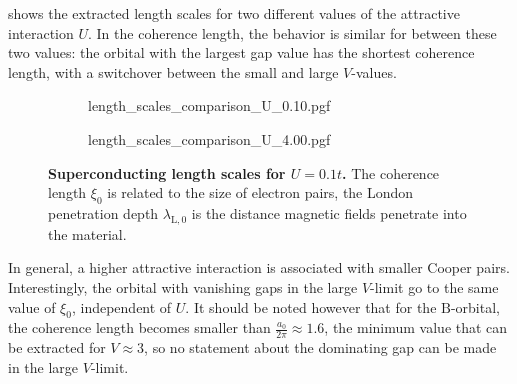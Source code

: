 \documentclass[../notes.tex]{subfiles}
\begin{document}
 shows the extracted length scales for two different values of the attractive interaction \(U\).
In the coherence length, the behavior is similar for between these two values: the orbital with the largest gap value has the shortest coherence length, with a switchover between the small and large \(V\)-values.
\begin{figure}[!tb]
	\centering
	\begin{subfigure}[b]{0.5\textwidth}
		\centering
		\caption{\hfill\null}\label{sfig:decorated graphene length scales U 0.10}
		{length_scales_comparison_U_0.10.pgf}
	\end{subfigure}%
	\begin{subfigure}[b]{0.5\textwidth}
		\centering
		\caption{\hfill\null}\label{sfig:decorated graphene length scales U 4.00}
		{length_scales_comparison_U_4.00.pgf}
	\end{subfigure}
	\caption[Superconducting length scales for \(U = 0.1t\).]{
		\textbf{Superconducting length scales for \(U = 0.1t\).} The coherence length \(\xi_0\) is related to the size of electron pairs, the London penetration depth \(\lambda_{\mathrm{L}, 0}\) is the distance magnetic fields penetrate into the material.
	}
	\label{fig:decorated graphene length scales}
\end{figure}
In general, a higher attractive interaction is associated with smaller Cooper pairs.
Interestingly, the orbital with vanishing gaps in the large \(V\)-limit go to the same value of \(\xi_0\), independent of \(U\).
It should be noted however that for the \(\mathrm{B}\)-orbital, the coherence length becomes smaller than \(\frac{a_0}{2 \pi} \approx 1.6\), the minimum value that can be extracted for \(V \approx 3\), so no statement about the dominating gap can be made in the large \(V\)-limit.
\end{document}
